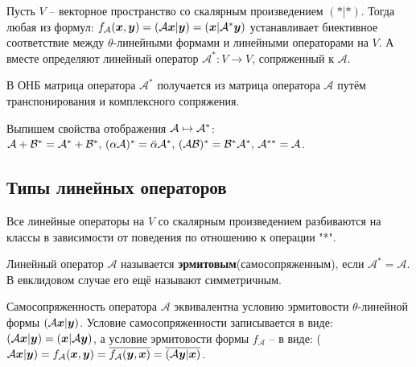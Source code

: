
\begin{to_thr} 
	Пусть $V$ -- векторное пространство со скалярным произведением $(*|*)$. Тогда любая из формул: $f_\mathcal{A} (\mbox{\boldmath $x$},\mbox{\boldmath $y$}) =(\mathcal{A} \mbox{\boldmath $x$} | \mbox{\boldmath $y$}) = (\mbox{\boldmath $x$}|\mathcal{A}^* \mbox{\boldmath $y$})$ устанавливает биективное соответствие между $\theta$-линейными формами и линейными операторами на $V$. А вместе определяют линейный оператор $\mathcal{A}^* \colon V \to V$, сопряженный к $\mathcal{A}$.

	В ОНБ матрица оператора $\mathcal{A}^*$ получается из матрица оператора $\mathcal{A}$ путём транспонирования и комплексного сопряжения.
\end{to_thr}

Выпишем свойства отображения $\mathcal A \mapsto \mathcal A^*$: $\mathcal A + \mathcal{B}^* = \mathcal A^* + \mathcal{B}^*, \, (\alpha \mathcal A)^* = \bar{\alpha} \mathcal A^*, \, (\mathcal A \mathcal{B})^* = \mathcal{B}^* \mathcal A^*, \, \mathcal A^{* *} = \mathcal A$.

\subsection{Типы линейных операторов}
Все линейные операторы на $V$ со скалярным произведением разбиваются на классы в зависимости от поведения по отношению к операции "*".
\begin{to_def} 
	Линейный оператор $\mathcal{A}$ называется \textbf{эрмитовым}(самосопряженным), если $\mathcal{A}^* = \mathcal{A}$. В евклидовом случае его ещё называют симметричным.
\end{to_def}



Самосопряженность оператора $\mathcal{A}$ эквивалентна условию эрмитовости $\theta$-линейной формы $(\mathcal{A} \mbox{\boldmath $x$}|\mbox{\boldmath $y$})$. 
Условие самосопряженности записывается в виде: $(\mathcal A \mbox{\boldmath $x$} | \mbox{\boldmath $y$}) = (\mbox{\boldmath $x$}| \mathcal 	A \mbox{\boldmath $y$})$, 
а условие эрмитовости формы $f_\mathcal{A}$ -- в виде: ($\mathcal{A} \mbox{\boldmath $x$} | \mbox{\boldmath $y$}) = f_\mathcal{A}(\mbox{\boldmath $x$},\mbox{\boldmath $y$}) = \overline{f_\mathcal{A}(\mbox{\boldmath $y$}, \mbox{\boldmath $x$})} = \overline{(\mathcal{A} \mbox{\boldmath $y$}|\mbox{\boldmath $x$})}$.

